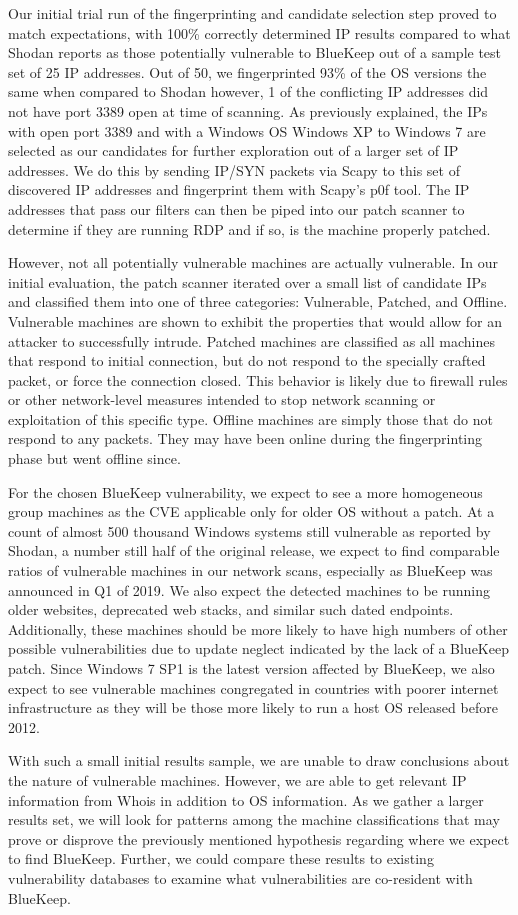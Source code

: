 Our initial trial run of the fingerprinting and candidate selection step proved to match expectations, with 100\% correctly determined IP results compared to what Shodan reports as those potentially vulnerable to BlueKeep out of a sample test set of 25 IP addresses. Out of 50, we fingerprinted 93\% of the OS versions the same when compared to Shodan however, 1 of the conflicting IP addresses did not have port 3389 open at time of scanning. As previously explained, the IPs with open port 3389 and with a Windows OS Windows XP to Windows 7 are selected as our candidates for further exploration out of a larger set of IP addresses. We do this by sending IP/SYN packets via Scapy to this set of discovered IP addresses and fingerprint them with Scapy's p0f tool. The IP addresses that pass our filters can then be piped into our patch scanner to determine if they are running RDP and if so, is the machine properly patched.

However, not all potentially vulnerable machines are actually vulnerable. In our initial evaluation, the patch scanner iterated over a small list of candidate IPs and classified them into one of three categories: Vulnerable, Patched, and Offline. Vulnerable machines are shown to exhibit the properties that would allow for an attacker to successfully intrude. Patched machines are classified as all machines that respond to initial connection, but do not respond to the specially crafted packet, or force the connection closed. This behavior is likely due to firewall rules or other network-level measures intended to stop network scanning or exploitation of this specific type. Offline machines are simply those that do not respond to any packets. They may have been online during the fingerprinting phase but went offline since.

For the chosen BlueKeep vulnerability, we expect to see a more homogeneous group machines as the CVE applicable only for older OS without a patch. At a count of almost 500 thousand Windows systems still vulnerable as reported by Shodan, a number still half of the original release, we expect to find comparable ratios of vulnerable machines in our network scans, especially as BlueKeep was announced in Q1 of 2019. We also expect the detected machines to be running older websites, deprecated web stacks, and similar such dated endpoints. Additionally, these machines should be more likely to have high numbers of other possible vulnerabilities due to update neglect indicated by the lack of a BlueKeep patch. Since Windows 7 SP1 is the latest version affected by BlueKeep, we also expect to see vulnerable machines congregated in countries with poorer internet infrastructure as they will be those more likely to run a host OS released before 2012.

With such a small initial results sample, we are unable to draw conclusions about the nature of vulnerable machines. However, we are able to get relevant IP information from Whois in addition to OS information. As we gather a larger results set, we will look for patterns among the machine classifications that may prove or disprove the previously mentioned hypothesis regarding where we expect to find BlueKeep. Further, we could compare these results to existing vulnerability databases to examine what vulnerabilities are co-resident with BlueKeep.